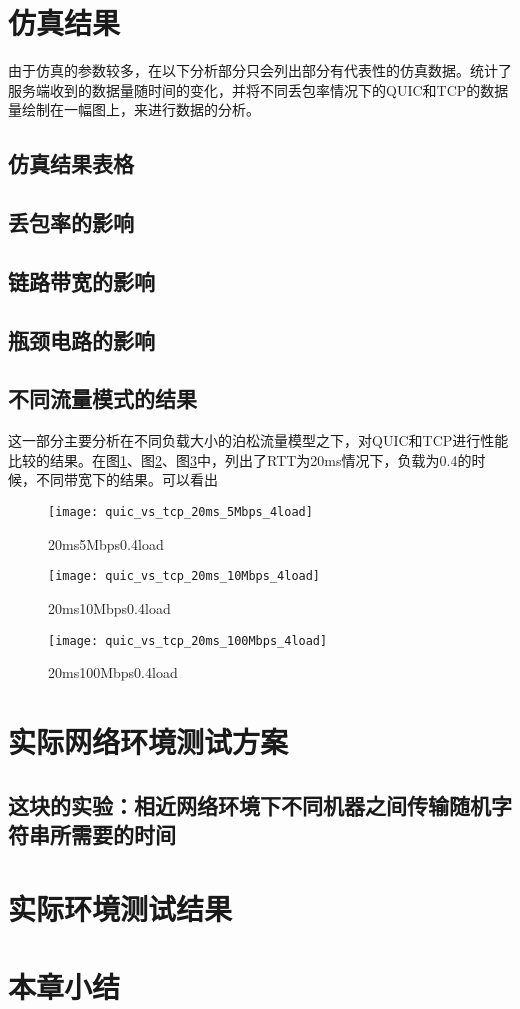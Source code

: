 \section{仿真结果}
由于仿真的参数较多，在以下分析部分只会列出部分有代表性的仿真数据。统计了服务端收到的数据量随时间的变化，并将不同丢包率情况下的QUIC和TCP的数据量绘制在一幅图上，来进行数据的分析。
\subsection{仿真结果表格}
\subsection{丢包率的影响}

\subsection{链路带宽的影响}
\subsection{瓶颈电路的影响}
\subsection{不同流量模式的结果}
这一部分主要分析在不同负载大小的泊松流量模型之下，对QUIC和TCP进行性能比较的结果。在图\ref{fig:load41}、图\ref{fig:load42}、图\ref{fig:load43}中，列出了RTT为20ms情况下，负载为0.4的时候，不同带宽下的结果。可以看出
\begin{figure}
	\centering
	\texttt{[image: quic\_vs\_tcp\_20ms\_5Mbps\_4load]}
	\caption{20ms5Mbps0.4load}
	\label{fig:load41}
\end{figure}
\begin{figure}
	\centering
	\texttt{[image: quic\_vs\_tcp\_20ms\_10Mbps\_4load]}
	\caption{20ms10Mbps0.4load}
	\label{fig:load42}
\end{figure}
\begin{figure}
	\centering
	\texttt{[image: quic\_vs\_tcp\_20ms\_100Mbps\_4load]}
	\caption{20ms100Mbps0.4load}
	\label{fig:load43}
\end{figure}


\section{实际网络环境测试方案}
\subsection{这块的实验：相近网络环境下不同机器之间传输随机字符串所需要的时间}
\section{实际环境测试结果}
\section{本章小结}


